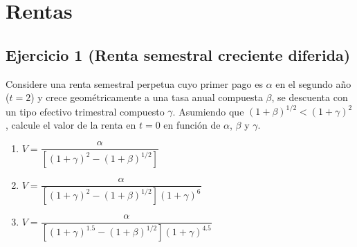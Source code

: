 \documentclass[12pt,a4paper]{article}
\newenvironment{ejercicio}[1]{\subsection*{Ejercicio #1}}{}
\begin{document}
\section{Rentas}

\begin{ejercicio}{1 (Renta semestral creciente diferida)}
Considere una renta semestral perpetua cuyo primer pago es $\alpha$ en el segundo año ($t=2$) y crece geométricamente a una tasa anual compuesta $\beta$, se descuenta con un tipo efectivo trimestral compuesto $\gamma$.
Asumiendo que $(1+\beta)^{1 / 2}<(1+\gamma)^2$, calcule el valor de la renta en $t=0$ en función de $\alpha$, $\beta$ y $\gamma$.

\medskip
\begin{enumerate}[label=\alph*)]
  \item $V=\dfrac{\alpha}{\left[(1+\gamma)^2-(1+\beta)^{1 / 2}\right]}$
  \item $\boxed{V=\dfrac{\alpha}{\left[(1+\gamma)^2-(1+\beta)^{1 / 2}\right] (1+\gamma)^6}}$
  \item $V=\dfrac{\alpha}{\left[(1+\gamma)^{1.5}-(1+\beta)^{1 / 2}\right] (1+\gamma)^{4.5}}$
\end{enumerate}
\end{ejercicio}
\end{document}
